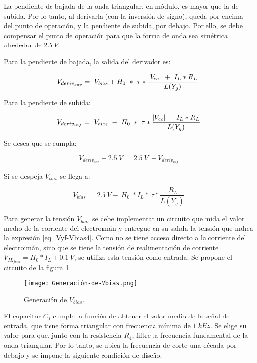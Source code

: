La pendiente de bajada de la onda triangular, en módulo, es mayor que la de subida. Por lo tanto, al derivarla (con la inversión de signo), queda por encima del punto de operación, y la pendiente de subida, por debajo. Por ello, se debe compensar el punto de operación para que la forma de onda sea simétrica alrededor de $2.5\:V$. 

Para la pendiente de bajada, la salida del derivador es:

\begin{equation} \label{eq_Vyf-Vbias}
	V_{deriv_{sup}} =\ V_{bias}+H_0\ *\ \tau *\frac{\abs{V_{cc}}\ +\ I_L*R_L}{L(Y_g)}\ 
\end{equation}

Para la pendiente de subida:

\begin{equation} \label{eq_Vyf-Vbias2}
	V_{deriv_{inf}} =\ V_{bias}\ -\ H_0\ *\ \tau *\frac{\abs{V_{cc}} -\ I_L*R_L}{L(Y_g)}
\end{equation}

Se desea que se cumpla:

\begin{equation} \label{eq_Vyf_Vbias3}
	V_{deriv_{sup}} -2.5\:V=\ 2.5\:V\ - V_{deriv_{inf}}
\end{equation}

Si se despeja $V_{bias}$ se llega a:

\begin{equation} \label{eq_Vyf-Vbias4}
	V_{bias}\ =2.5 \:V -\ H_0\ *I_L*\ \tau *\frac{\ R_L}{L(Y_g)}
\end{equation}

Para generar la tensión $V_{bias}$ se debe implementar un circuito que mida el valor medio de la corriente del electroimán y entregue en su salida la tensión que indica la expresión \ref{eq_Vyf-Vbias4}. Como no se tiene acceso directo a la corriente del electroimán, sino que se tiene la tensión de realimentación de corriente $V_{IL_{feed}}=H_0*I_L+0.1\:V$, se utiliza esta tensión como entrada. Se propone el circuito de la figura \ref{fig:img_Generación_de_Vbias}.

\begin{figure}[H]
	\centering
	\texttt{[image: Generación-de-Vbias.png]}
	\caption{Generación de $V_{bias}$.}
	\label{fig:img_Generación_de_Vbias}
\end{figure}

El capacitor $C_1$ cumple la función de obtener el valor medio de la señal de entrada, que tiene forma triangular con frecuencia mínima de $1\:kHz$. Se elige su valor para que, junto con la resistencia $R_4$, filtre la frecuencia fundamental de la onda triangular. Por lo tanto, se ubica la frecuencia de corte una década por debajo y se impone la siguiente condición de diseño:

